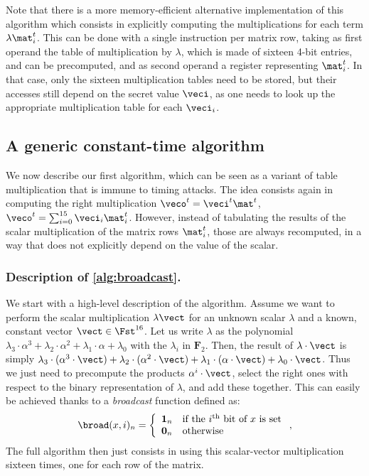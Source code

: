 Note that there is a more memory-efficient alternative implementation of this algorithm which consists in explicitly computing the multiplications for each term $\lambda\mat^t_i$.
This can be done with a single \pshufb instruction per matrix row, taking as first operand the table of multiplication by $\lambda$, which is made of sixteen
4-bit entries, and can be precomputed, and as second operand a register representing $\mat^t_i$.
In that case, only the sixteen multiplication tables need to be stored, but their accesses
still depend on the secret value $\veci$, as one needs to look up the appropriate multiplication table for each $\veci_i$.


\subsection{A generic constant-time algorithm}
\label{bbased}
We now describe our first algorithm, which can be seen as a variant of table multiplication that is immune to timing attacks.
The idea consists again in computing the right multiplication $\veco^t = \veci^t\mat^t$, \ie{} $\veco^t = \sum_{i = 0}^{15} \veci_i\mat^t_i$. However, instead of tabulating
the results of the scalar multiplication of the matrix rows $\mat^t_i$, those are always recomputed, in a way that does not explicitly depend on the value of the scalar.

\subsubsection{Description of \autoref{alg:broadcast}.}
We start with a high-level description of the algorithm.
Assume we want to perform the scalar multiplication $\lambda\vect$ for an unknown scalar $\lambda$ and a known, constant vector $\vect \in \Fst^{16}$.
Let us write $\lambda$ as the polynomial
$\lambda_3\cdot \alpha^3 + \lambda_2\cdot \alpha^2 + \lambda_1\cdot \alpha + \lambda_0$ with the $\lambda_i$ in $\mathbf{F}_2$.
Then, the result of $\lambda\cdot\vect$ is simply $\lambda_3\cdot(\alpha^3\cdot\vect) + \lambda_2\cdot(\alpha^2\cdot\vect) + \lambda_1\cdot(\alpha\cdot\vect) + \lambda_0\cdot\vect$.
Thus we just need to precompute the products $\alpha^i\cdot\vect$, select the right ones with respect to the binary representation
of $\lambda$, and add these together.
This can easily be achieved thanks to a \emph{broadcast} function defined as:
\[
\broad(x,i)_n = \left\{
				\begin{array}{ll}
				\mathbf{1}_n  & \text{if the $i^\text{th}$ bit of $x$ is set}\\
				\mathbf{0}_n & \text{otherwise}
				\end{array}
	    \right.,
\]
The full algorithm then just consists in using this
scalar-vector multiplication sixteen times, one for each row of the matrix.

